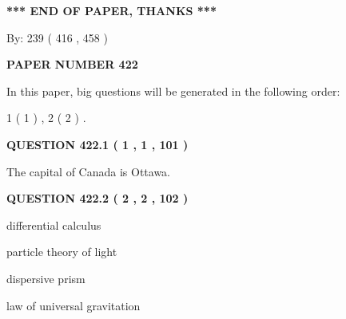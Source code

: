 \documentclass[12pt]{article}
\begin{document}
 
 
 
   
   
\vspace{1.0in} 
{\textbf{\large{ *** END OF PAPER, THANKS *** }}} 
   
   
\hspace{1.0in} By: 
 239 ( 416 ,  458 )
   
   
   
   
\newpage 
\setcounter{page}{ 
   422001 } 
   
   
   
   
 {\textbf{ \Large{ PAPER NUMBER  422  }}}
   
   
\vspace{0.2in}
   
   
   
   
   
\vspace{0.2in}
   
In this paper, big questions will be generated in the following order: 
   
   
   1 ( 1 )
 ,
   2 ( 2 )
 .
  
\vspace{0.2in}
  
{\textbf{\Large{QUESTION
422.1 
 ( 1 , 1 , 101 )
}}}
  
  
 
 
\noindent{}
 
 
The capital of Canada is Ottawa.
 
 
 
 
  
\vspace{0.2in}
  
{\textbf{\Large{QUESTION
422.2 
 ( 2 , 2 , 102 )
}}}
  
  
 
 
\noindent{}
 
 
differential calculus
 
 
particle theory of light
 
 
dispersive prism
 
 
law of universal gravitation
 
\end{document}
